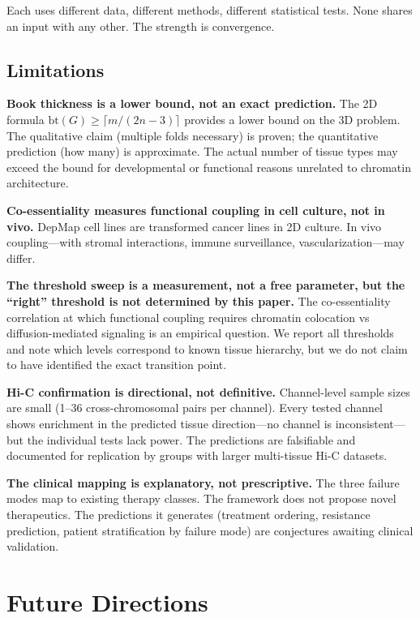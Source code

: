 \documentclass[11pt]{article}
\theoremstyle{definition}
\begin{document}
Each uses different data, different methods, different statistical tests. None shares an input with any other. The strength is convergence.

\subsection{Limitations}

\textbf{Book thickness is a lower bound, not an exact prediction.} The 2D formula $\mathrm{bt}(G) \geq \lceil m/(2n{-}3) \rceil$ provides a lower bound on the 3D problem. The qualitative claim (multiple folds necessary) is proven; the quantitative prediction (how many) is approximate. The actual number of tissue types may exceed the bound for developmental or functional reasons unrelated to chromatin architecture.

\textbf{Co-essentiality measures functional coupling in cell culture, not in vivo.} DepMap cell lines are transformed cancer lines in 2D culture. In vivo coupling---with stromal interactions, immune surveillance, vascularization---may differ.

\textbf{The threshold sweep is a measurement, not a free parameter, but the ``right'' threshold is not determined by this paper.} The co-essentiality correlation at which functional coupling requires chromatin colocation vs diffusion-mediated signaling is an empirical question. We report all thresholds and note which levels correspond to known tissue hierarchy, but we do not claim to have identified the exact transition point.

\textbf{Hi-C confirmation is directional, not definitive.} Channel-level sample sizes are small (1--36 cross-chromosomal pairs per channel). Every tested channel shows enrichment in the predicted tissue direction---no channel is inconsistent---but the individual tests lack power. The predictions are falsifiable and documented for replication by groups with larger multi-tissue Hi-C datasets.

\textbf{The clinical mapping is explanatory, not prescriptive.} The three failure modes map to existing therapy classes. The framework does not propose novel therapeutics. The predictions it generates (treatment ordering, resistance prediction, patient stratification by failure mode) are conjectures awaiting clinical validation.

\section{Future Directions}
\end{document}
